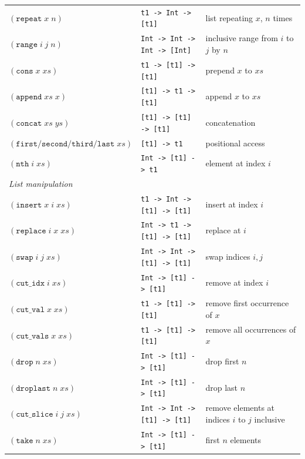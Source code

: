 \documentclass[12pt]{article}
\begin{document}
\begin{table}[!htbp]
\begin{tabular}{lll}
$(\texttt{repeat}\;x\;n)$               & \texttt{t1 -> Int -> [t1]}        & list repeating $x$, $n$ times \\
$(\texttt{range}\;i\;j\;n)$             & \texttt{Int -> Int -> Int -> [Int]} & inclusive range from $i$ to $j$ by $n$ \\
$(\texttt{cons}\;x\;\mathit{xs})$       & \texttt{t1 -> [t1] -> [t1]}       & prepend $x$ to $\mathit{xs}$ \\
$(\texttt{append}\;\mathit{xs}\;x)$     & \texttt{[t1] -> t1 -> [t1]}       & append $x$ to $\mathit{xs}$ \\
$(\texttt{concat}\;\mathit{xs}\;\mathit{ys})$ & \texttt{[t1] -> [t1] -> [t1]} & concatenation \\
$(\texttt{first}/\texttt{second}/\texttt{third}/\texttt{last}\;\mathit{xs})$
                                        & \texttt{[t1] -> t1}               & positional access \\
$(\texttt{nth}\;i\;\mathit{xs})$        & \texttt{Int -> [t1] -> t1}        & element at index $i$ \\
\midrule
\multicolumn{3}{l}{\textit{List manipulation}} \\
$(\texttt{insert}\;x\;i\;\mathit{xs})$  & \texttt{t1 -> Int -> [t1] -> [t1]} & insert at index $i$ \\
$(\texttt{replace}\;i\;x\;\mathit{xs})$ & \texttt{Int -> t1 -> [t1] -> [t1]} & replace at $i$ \\
$(\texttt{swap}\;i\;j\;\mathit{xs})$    & \texttt{Int -> Int -> [t1] -> [t1]} & swap indices $i,j$ \\
$(\texttt{cut\_idx}\;i\;\mathit{xs})$   & \texttt{Int -> [t1] -> [t1]}      & remove at index $i$ \\
$(\texttt{cut\_val}\;x\;\mathit{xs})$   & \texttt{t1 -> [t1] -> [t1]}       & remove first occurrence of $x$ \\
$(\texttt{cut\_vals}\;x\;\mathit{xs})$  & \texttt{t1 -> [t1] -> [t1]}       & remove all occurrences of $x$ \\
$(\texttt{drop}\;n\;\mathit{xs})$       & \texttt{Int -> [t1] -> [t1]}      & drop first $n$ \\
$(\texttt{droplast}\;n\;\mathit{xs})$   & \texttt{Int -> [t1] -> [t1]}      & drop last $n$ \\
$(\texttt{cut\_slice}\;i\;j\;\mathit{xs})$ & \texttt{Int -> Int -> [t1] -> [t1]} & remove elements at indices $i$ to $j$ inclusive \\
$(\texttt{take}\;n\;\mathit{xs})$       & \texttt{Int -> [t1] -> [t1]}      & first $n$ elements \\

\end{tabular}
\end{table}
\end{document}
